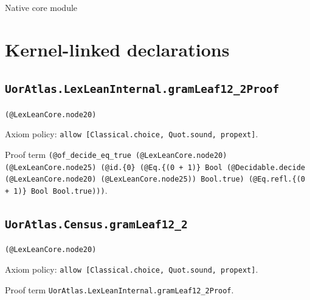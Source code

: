 \documentclass[11pt]{article}
\begin{document}
\begin{center}{\LARGE Native core module}\end{center}
\section*{Kernel-linked declarations}
\subsection*{\texttt{UorAtlas.LexLeanInternal.gramLeaf12\_2Proof}}
\noindent\texttt{(@LexLeanCore.node20)}\par
\noindent Axiom policy: \texttt{allow [Classical.choice, Quot.sound, propext]}.\par
\noindent Proof term \texttt{(@of\_decide\_eq\_true (@LexLeanCore.node20) (@LexLeanCore.node25) (@id.\{0\} (@Eq.\{(0 + 1)\} Bool (@Decidable.decide (@LexLeanCore.node20) (@LexLeanCore.node25)) Bool.true) (@Eq.refl.\{(0 + 1)\} Bool Bool.true)))}.\par
\subsection*{\texttt{UorAtlas.Census.gramLeaf12\_2}}
\noindent\texttt{(@LexLeanCore.node20)}\par
\noindent Axiom policy: \texttt{allow [Classical.choice, Quot.sound, propext]}.\par
\noindent Proof term \texttt{UorAtlas.LexLeanInternal.gramLeaf12\_2Proof}.\par
\end{document}
